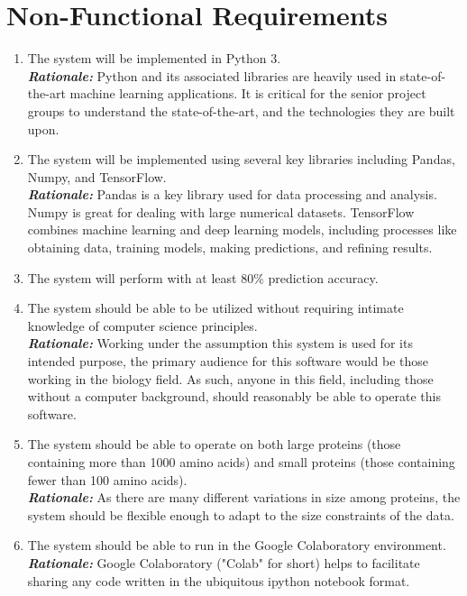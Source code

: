 \documentclass[12pt,letterpaper,oneside,reqno]{book}
\theoremstyle{plain}
\theoremstyle{definition}
\theoremstyle{plain}
\theoremstyle{remark}
\theoremstyle{plain}
\theoremstyle{definition}
\theoremstyle{plain}
\begin{document}
\section{Non-Functional Requirements}
\begin{enumerate}
    \item The system will be implemented in Python 3. \\
    \textbf{\textit{Rationale:}} Python and its associated libraries are heavily used in state-of-the-art machine learning applications. It is critical for the senior project groups to understand the state-of-the-art, and the technologies they are built upon.
    
    \item The system will be implemented using several key libraries including Pandas, Numpy, and TensorFlow. \\
    \textbf{\textit{Rationale:}} Pandas is a key library used for data processing and analysis. Numpy is great for dealing with large numerical datasets. TensorFlow combines machine learning and deep learning models, including processes like obtaining data, training models, making predictions, and refining results.
    
    \item The system will perform with at least 80\% prediction accuracy.
    
    \item The system should be able to be utilized without requiring intimate knowledge of computer science principles. \\
    \textbf{\textit{Rationale:}} Working under the assumption this system is used for its intended purpose, the primary audience for this software would be those working in the biology field. As such, anyone in this field, including those without a computer background, should reasonably be able to operate this software.
    
    \item The system should be able to operate on both large proteins (those containing more than 1000 amino acids) and small proteins (those containing fewer than 100 amino acids). \\
    \textbf{\textit{Rationale:}} As there are many different variations in size among proteins, the system should be flexible enough to adapt to the size constraints of the data.
    
    \item The system should be able to run in the Google Colaboratory environment. \\
    \textbf{\textit{Rationale:}} Google Colaboratory ("Colab" for short) helps to facilitate sharing any code written in the ubiquitous ipython notebook format.
    
\end{enumerate} %
\end{document}
